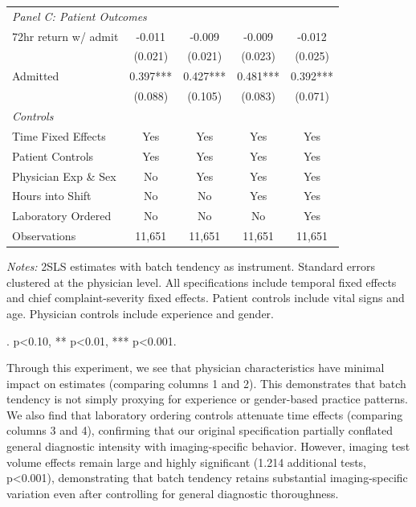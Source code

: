 \documentclass[11pt]{article}
\newcommand{\1}{\hbox{\rm 1\kern-.35em 1}}
\begin{document}
{\begin{table}[h]
\begin{threeparttable}
\begin{tabular}{lcccc}
\multicolumn{4}{l}{\textit{Panel C: Patient Outcomes}} \\[0.5em]
72hr return w/ admit & -0.011 & -0.009 & -0.009  & -0.012 \\
& (0.021) & (0.021) & (0.023) & (0.025) \\[0.5em]
Admitted & 0.397*** & 0.427*** & 0.481***  & 0.392*** \\
& (0.088) & (0.105) & (0.083)  & (0.071) \\
\midrule
\textit{Controls} \\
Time Fixed Effects & Yes & Yes & Yes & Yes \\
Patient Controls & Yes & Yes & Yes & Yes \\
Physician Exp \& Sex & No & Yes & Yes & Yes \\
Hours into Shift & No & No & Yes & Yes \\
Laboratory Ordered & No & No & No & Yes \\
\midrule
Observations & 11,651 & 11,651 & 11,651 & 11,651 \\
\bottomrule
\end{tabular}
\begin{tablenotes}
\footnotesize
\item \textit{Notes:} 2SLS estimates with batch tendency as instrument. Standard errors clustered at the physician level. All specifications include temporal fixed effects and chief complaint-severity fixed effects. Patient controls include vital signs and age. Physician controls include experience and gender. 
\item . p<0.10, ** p<0.01, *** p<0.001.
\end{tablenotes}
\end{threeparttable}
\end{table}

Through this experiment, we see that physician characteristics have minimal impact on estimates (comparing columns 1 and 2). This demonstrates that batch tendency is not simply proxying for experience or gender-based practice patterns. We also find that laboratory ordering controls attenuate time effects (comparing columns 3 and 4), confirming that our original specification partially conflated general diagnostic intensity with imaging-specific behavior. However, imaging test volume effects remain large and highly significant (1.214 additional tests, p<0.001), demonstrating that batch tendency retains substantial imaging-specific variation even after controlling for general diagnostic thoroughness.

}
\end{document}

